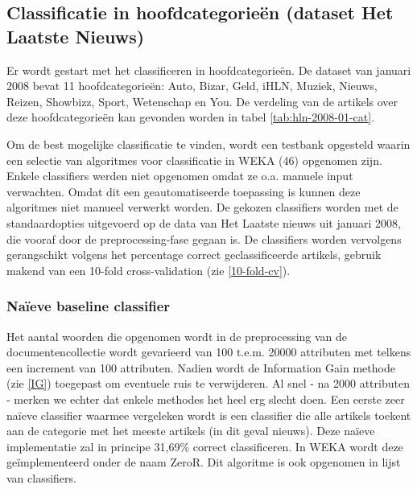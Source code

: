 \subsection{Classificatie in hoofdcategorie\"en (dataset Het Laatste Nieuws)}
Er wordt gestart met het classificeren in hoofdcategorie\"en. De dataset van januari 2008 bevat 11 hoofdcategorie\"en: Auto, Bizar, Geld, iHLN, Muziek, Nieuws, Reizen, Showbizz, Sport, Wetenschap en You. De verdeling van de artikels over deze hoofdcategorie\"en kan gevonden worden in tabel \ref{tab:hln-2008-01-cat}.

Om de best mogelijke classificatie te vinden, wordt een testbank opgesteld waarin een selectie van algoritmes voor classificatie in WEKA (46) opgenomen zijn. Enkele classifiers werden niet opgenomen omdat ze o.a. manuele input verwachten. Omdat dit een geautomatiseerde toepassing is kunnen deze algoritmes niet manueel verwerkt worden. De gekozen classifiers worden met de standaardopties uitgevoerd op de data van Het Laatste nieuws uit januari 2008, die vooraf door de preprocessing-fase gegaan is. De classifiers worden vervolgens gerangschikt volgens het percentage correct geclassificeerde artikels, gebruik makend van een 10-fold cross-validation (zie \ref{10-fold-cv}).

\subsubsection{Na\"ieve baseline classifier}\label{naieve-classifier}
Het aantal woorden die opgenomen wordt in de preprocessing van de documentencollectie wordt gevarieerd van 100 t.e.m. 20000 attributen met telkens een increment van 100 attributen. Nadien wordt de Information Gain methode (zie \ref{IG}) toegepast om eventuele ruis te verwijderen. Al snel - na 2000 attributen - merken we echter dat enkele methodes het heel erg slecht doen. Een eerste zeer na\"ieve classifier waarmee vergeleken wordt is een classifier die alle artikels toekent aan de categorie met het meeste artikels (in dit geval nieuws). Deze na\"ieve implementatie zal in principe 31,69\% correct classificeren. In WEKA wordt deze ge\"implementeerd onder de naam ZeroR. Dit algoritme is ook opgenomen in lijst van classifiers. 

